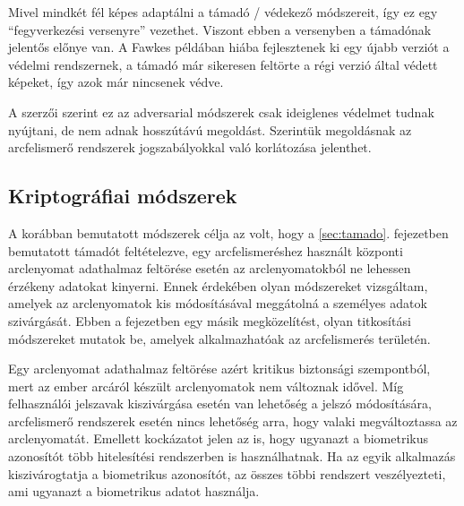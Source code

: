 Mivel mindkét fél képes adaptálni a támadó / védekező módszereit, így ez egy ``fegyverkezési versenyre'' vezethet. Viszont ebben a versenyben a támadónak jelentős előnye van. A Fawkes példában hiába fejlesztenek ki egy újabb verziót a védelmi rendszernek, a támadó már sikeresen feltörte a régi verzió által védett képeket, így azok már nincsenek védve.

A \cite{radiya2021data} szerzői szerint ez az adversarial módszerek csak ideiglenes védelmet tudnak nyújtani, de nem adnak hosszútávú megoldást. Szerintük megoldásnak az arcfelismerő rendszerek jogszabályokkal való korlátozása jelenthet. 

\subsection{Kriptográfiai módszerek}


A korábban bemutatott módszerek célja az volt, hogy a \ref{sec:tamado}. fejezetben bemutatott támadót feltételezve, egy arcfelismeréshez használt központi arclenyomat adathalmaz feltörése esetén az arclenyomatokból ne lehessen érzékeny adatokat kinyerni. Ennek érdekében olyan módszereket vizsgáltam, amelyek az arclenyomatok kis módosításával meggátolná a személyes adatok szivárgását. Ebben a fejezetben egy másik megközelítést, olyan titkosítási módszereket mutatok be, amelyek alkalmazhatóak az arcfelismerés területén.

Egy arclenyomat adathalmaz feltörése azért kritikus biztonsági szempontból, mert az ember arcáról készült arclenyomatok nem változnak idővel. Míg felhasználói jelszavak kiszivárgása esetén van lehetőség a jelszó módosítására, arcfelismerő rendszerek esetén nincs lehetőség arra, hogy valaki megváltoztassa az arclenyomatát. Emellett kockázatot jelen az is, hogy ugyanazt a biometrikus azonosítót több hitelesítési rendszerben is használhatnak. Ha az egyik alkalmazás kiszivárogtatja a biometrikus azonosítót, az összes többi rendszert veszélyezteti, ami ugyanazt a biometrikus adatot használja.

